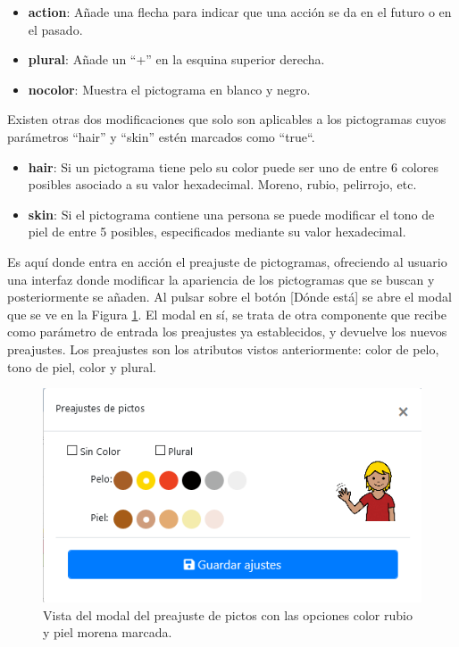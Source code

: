 \begin{itemize}
	\item \textbf{action}: Añade una flecha para indicar que una acción se da en el futuro o en el pasado.
	\item \textbf{plural}: Añade un “+” en la esquina superior derecha.
	\item \textbf{nocolor}: Muestra el pictograma en blanco y negro.
	
\end{itemize}

Existen otras dos modificaciones que solo son aplicables a los pictogramas cuyos parámetros “hair” y “skin” estén marcados como “true“.


\begin{itemize}
	\item \textbf{hair}: Si un pictograma tiene pelo su color puede ser uno de entre 6 colores posibles asociado a su valor hexadecimal. Moreno, rubio, pelirrojo, etc.
	
	\item \textbf{skin}: Si el pictograma contiene una persona se puede modificar el tono de piel de entre 5 posibles, especificados mediante su valor hexadecimal.
	
\end{itemize}

Es aquí donde entra en acción el preajuste de pictogramas, ofreciendo al usuario una interfaz donde modificar la apariencia de los pictogramas que se buscan y posteriormente se añaden. Al pulsar sobre el botón [Dónde está] se abre el modal que se ve en la Figura \ref{fig:modalpreajustepicto}. El modal en sí, se trata de otra componente que recibe como parámetro de entrada los preajustes ya establecidos, y devuelve los nuevos preajustes. Los preajustes son los atributos vistos anteriormente: color de pelo, tono de piel, color y plural.

\begin{figure}[h!]
	\centering
	\includegraphics[width=0.7\linewidth]{Imagenes/Bitmap/modalPreajustePicto}
	\caption{Vista del modal del preajuste de pictos con las opciones color rubio y piel morena marcada.}
	\label{fig:modalpreajustepicto}
\end{figure}



